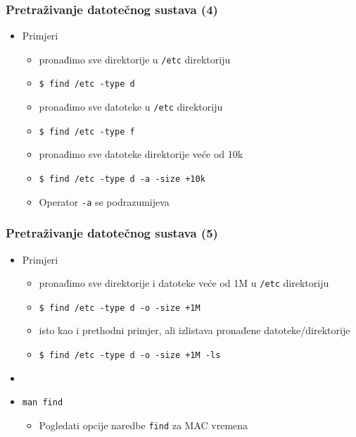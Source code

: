 \documentclass{beamer}
\newcommand{\shell}[1]{\texttt{#1}}
\begin{document}
\begin{frame}[t]
\frametitle{Pretraživanje datotečnog sustava (4)}
\begin{itemize}
  \item Primjeri
  \begin{itemize}
    \item pronađimo sve direktorije u \shell{/etc} direktoriju
    \item[] \shell{\$ find /etc -type d}
    \item pronađimo sve datoteke u \shell{/etc} direktoriju
    \item[] \shell{\$ find /etc -type f}
    \item pronađimo sve datoteke direktorije veće od 10k
    \item[] \shell{\$ find /etc -type d -a -size +10k}
    \item Operator \shell{-a} se podrazumijeva
  \end{itemize}
\end{itemize}
\end{frame}

\begin{frame}[t]
\frametitle{Pretraživanje datotečnog sustava (5)}
\begin{itemize}
  \item Primjeri
  \begin{itemize}
    \item pronađimo sve direktorije i datoteke veće od 1M u \shell{/etc}
          direktoriju
    \item[] \shell{\$ find /etc -type d -o -size +1M}
    \item isto kao i prethodni primjer, ali izlistava pronađene
          datoteke/direktorije
    \item[] \shell{\$ find /etc -type d -o -size +1M -ls}
  \end{itemize}
  \item[]
  \item[] \shell{man find}
  \begin{itemize}
    \item Pogledati opcije naredbe \shell{find} za MAC vremena
  \end{itemize}
\end{itemize}
\end{frame}
\end{document}
